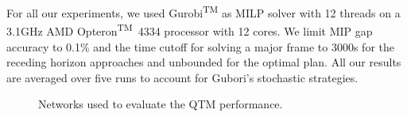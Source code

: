 For all our experiments, we used Gurobi\textsuperscript{TM} as MILP solver with
12 threads on a 3.1GHz AMD Opteron\textsuperscript{TM}~4334 processor with 12
cores.
%
We limit MIP gap accuracy to 0.1\% and the time cutoff for solving a major frame
to 3000s for the receding horizon approaches and unbounded for the optimal plan.
%
%
All our results are averaged over five runs to account for Gubori's
stochastic strategies.




\begin{figure*}[t!]
\centering
\caption{Networks used to evaluate the QTM performance. }
\label{fig:networks}
\end{figure*}






